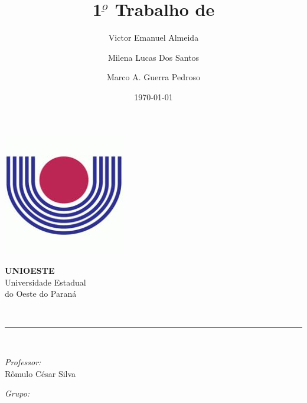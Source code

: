 \documentclass[12pt, a4paper]{article}
\author{Victor Emanuel Almeida\and Milena Lucas Dos Santos\and Marco A. Guerra Pedroso}
\title{1$^{\underbar{o}}$ Trabalho de \materia}
\date{\today}
\newcommand{\prof}{Rômulo César Silva}
\begin{document}
\begin{titlepage}
    \centering
    \thispagestyle{fancy}

    \begin{minipage}{0.4\textwidth}
        \begin{flushleft}
            \includegraphics[scale=0.6]{logoUnioeste.jpeg}\\[1.0 cm]
        \end{flushleft}
    \end{minipage}
    \begin{minipage}{0.5\textwidth}
        \begin{flushright}\large
            \textsc{\LARGE\textbf{UNIOESTE}}\\
            \vspace{1cm}
            Universidade Estadual\\do Oeste do Paraná
        \end{flushright}
    \end{minipage}
    \vspace*{4.5 cm}

    {\huge\bfseries\thetitle}\\
    \rule{\linewidth}{0.2 mm}\\[1.5 cm]

    \vspace{2cm}
    \begin{minipage}[t]{0.4\textwidth}
        \begin{flushleft}\large
            \emph{Professor:}\\
            \prof\\
        \end{flushleft}
    \end{minipage}
    \begin{minipage}[t]{0.5\textwidth}

        \begin{flushright}\large
            \emph{Grupo:}\\
            \theauthor
        \end{flushright}

    \end{minipage}\\[2 cm]

    \vfill\thedate
\end{titlepage}
\end{document}
